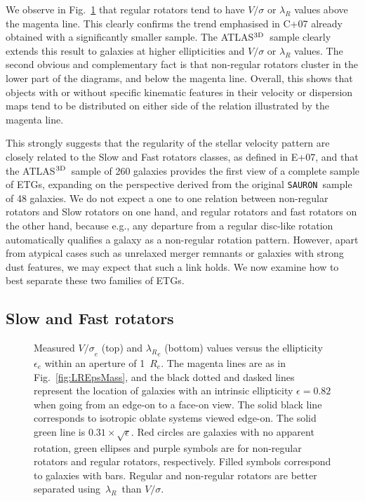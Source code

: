 \documentclass[useAMS,usenatbib,usegraphicx]{mn2e}
\newcommand{\Sauron}{\texttt{SAURON}}
\newcommand{\atlas}{{ATLAS$^{\rm 3D}$}}
\newcommand{\lr}{\,{$\lambda_R$}}
\begin{document}
We observe in Fig.~\ref{fig:LRVS_NDR} that regular rotators tend to have $V/\sigma$
or $\lambda_R$ values above the magenta line. This clearly confirms the trend
emphasised in C+07 already obtained with a significantly smaller sample. The \atlas\
sample clearly extends this result to galaxies at higher
ellipticities and $V/\sigma$ or $\lambda_R$ values. The second obvious and
complementary fact is that non-regular rotators cluster in the lower part of the diagrams, and below the magenta line. 
Overall, this shows that objects with or without specific kinematic features 
in their velocity or dispersion maps tend to be distributed on either
side of the relation illustrated by the magenta line.

This strongly suggests that the regularity of the stellar velocity pattern are closely related to the Slow
and Fast rotators classes, as defined in E+07, and that
the \atlas\ sample of 260 galaxies provides the first view of a complete sample
of ETGs, expanding on the perspective derived from the original \Sauron\ sample
of 48 galaxies. We do not expect a one to one relation between non-regular
rotators and Slow rotators on one hand, and regular rotators and fast rotators on the other hand, because e.g., any
departure from a regular disc-like rotation automatically qualifies a
galaxy as a non-regular rotation pattern. However, apart from atypical cases such as unrelaxed merger
remnants or galaxies with strong dust features, we may expect that such a 
link holds. We now examine how to best separate these two families of ETGs.

\subsection{Slow and Fast rotators}
\begin{figure}
\centering
{}
\caption{Measured ${V/\sigma}_e$ (top) and ${\lambda_R}_e$ (bottom) values versus the
ellipticity ${\epsilon}_e$ within an aperture of 1~$R_e$.
The magenta lines are as in Fig.~\ref{fig:LREpsMass}, and the black dotted and
dasked lines represent the location of galaxies with an intrinsic ellipticity $\epsilon=0.82$
when going from an edge-on to a face-on view. The solid black line corresponds
to isotropic oblate systems viewed edge-on. The solid green line is $0.31
\times \sqrt{\epsilon}$. 
Red circles are galaxies with no apparent rotation, green ellipses and purple
symbols are for non-regular rotators and regular rotators, respectively. Filled symbols correspond to
galaxies with bars. Regular and non-regular rotators are better separated using \lr\ than
$V/\sigma$.}
\label{fig:LRVS_NDR}
\end{figure}
\end{document}
